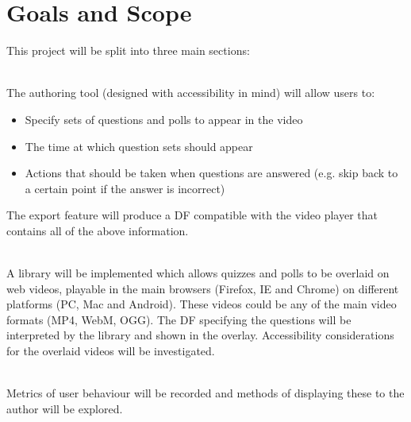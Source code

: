 \section{Goals and Scope} 
\label{Section:Goals and Scope}
This project will be split into three main sections:
\begin{description}[%
  before={\setcounter{descriptcount}{0}},%
  ,font=\bfseries\stepcounter{descriptcount}\thedescriptcount~]
\item[Quiz Authoring Tool] \hfill \\
The authoring tool (designed with accessibility in mind) will allow users to:
\begin{itemize}
\item Specify sets of questions and polls to appear in the video
\item The time at which question sets should appear
\item Actions that should be taken when questions are answered (e.g. skip back to a certain point if the answer is incorrect)
\end{itemize}

The export feature will produce a \gls{DF} compatible with the video player that contains all of the above information.

\item[Overlaid Video Player] \hfill \\
A library will be implemented which allows quizzes and polls to be overlaid on web videos, playable in the main browsers (Firefox, IE and Chrome) on different platforms (PC, Mac and Android). These videos could be any of the main video formats (MP4, WebM, OGG). The \gls{DF} specifying the questions will be interpreted by the library and shown in the overlay. Accessibility considerations for the overlaid videos will be investigated.
\item[Video and Quiz Analytics] \hfill \\
Metrics of user behaviour will be recorded and methods of displaying these to the author will be explored.
\end{description}